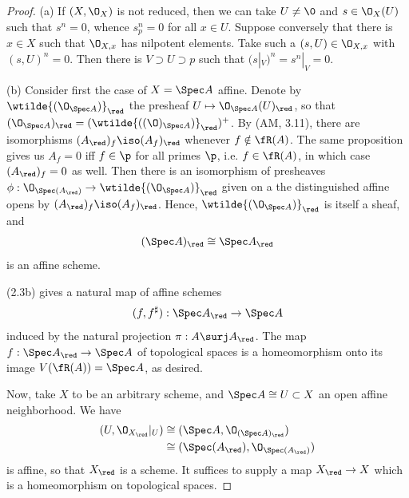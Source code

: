\documentclass[12pt]{amsart}
\begin{document}
\begin{proof}
  (a) If $(X,\O_X)$ is not reduced, then we can take $U\neq \0$ and $s\in \O_X(U)$ such that $s^n=0$, whence $s^n_p=0$ for all $x\in U$.
  Suppose conversely that there is $x\in X$ such that $\O_{X,x}$ has nilpotent elements.
  Take such a $(s,U)\in \O_{X,x}$ with $(s,U)^n=0$.
  Then there is $V\supset U\supset p$ such that $(s|_V)^n=s^n|_V=0$.

  (b) %
  Consider first the case of $X=\Spec A$ affine.
  Denote by $\wtilde{(\O_{\Spec A})}_\red$ the presheaf $U\mapsto \O_{\Spec A}(U)_\red$, so that $(\O_{\Spec A})_\red= (\wtilde{((\O)_{\Spec A})}_\red)^+$.
  By (AM, 3.11), there are isomorphisms $(A_\red)_f\iso (A_f)_\red$ whenever $f\notin \fR(A)$.
  The same proposition gives us $A_f=0$ iff $f\in \p$ for all primes $\p$, i.e. $f\in \fR(A)$, in which case $(A_\red)_f=0$ as well.
  Then there is an isomorphism of presheaves $\phi:\O_{\Spec (A_\red)}\to\wtilde{(\O_{\Spec A})}_\red$ given on a the distinguished affine opens by $(A_\red)_f\iso (A_f)_\red$.
  Hence, $\wtilde{(\O_{\Spec A})}_\red$ is itself a sheaf, and
  \begin{align*}
    (\Spec A)_\red \cong \Spec A_\red
  \end{align*}
  is an affine scheme.

  (2.3b) gives a natural map of affine schemes
  \[
    (f,f^\sharp):\Spec A_\red\to \Spec A
  \] 
  induced by the natural projection $\pi:A\surj A_\red$.
  The map $f:\Spec A_\red\to \Spec A$ of topological spaces is a homeomorphism onto its image $V(\fR(A))=\Spec A$, as desired.

  Now, take $X$ to be an arbitrary scheme, and $\Spec A\cong U\subset X$ an open affine neighborhood.
  We have
  \begin{align*}
    (U,\O_{X_\red}|_U) 
    &\cong (\Spec A, \O_{(\Spec A)_\red}) \\
    &\cong (\Spec (A_\red), \O_{\Spec (A_\red)})
  \end{align*}
  is affine, so that $X_\red$ is a scheme.
  It suffices to supply a map $X_\red\to X$ which is a homeomorphism on topological spaces.


\end{proof}
\end{document}
